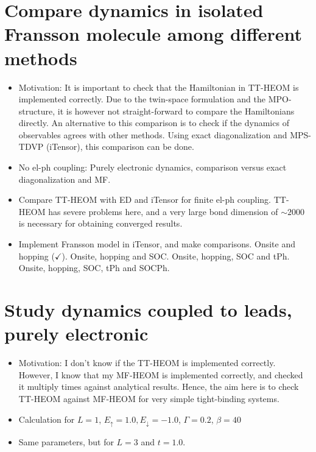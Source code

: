 \documentclass{article}
\begin{document}
\section{Compare dynamics in isolated Fransson molecule among different methods}
\begin{itemize}
	\item Motivation: It is important to check that the Hamiltonian in TT-HEOM is implemented correctly. Due to the twin-space formulation and the MPO-structure, it is however not straight-forward to compare the Hamiltonians directly. An alternative to this comparison is to check if the dynamics of observables agrees with other methods. Using exact diagonalization and MPS-TDVP (iTensor), this comparison can be done.
	\item[$\checkmark$] No el-ph coupling: Purely electronic dynamics, comparison versus exact diagonalization and MF. 
	\item[(partially done)] Compare TT-HEOM with ED and iTensor for finite el-ph coupling. {\color{red} TT-HEOM has severe problems here, and a very large bond dimension of $\sim 2000$ is necessary for obtaining converged results.}
	\item[(partially done)] Implement Fransson model in iTensor, and make comparisons. Onsite and hopping ($\checkmark$). Onsite, hopping and SOC. Onsite, hopping, SOC and tPh. Onsite, hopping, SOC, tPh and SOCPh.
\end{itemize}
\section{Study dynamics coupled to leads, purely electronic}
\begin{itemize}
	\item Motivation: I don't know if the TT-HEOM is implemented correctly. However, I know that my MF-HEOM is implemented correctly, and checked it multiply times against analytical results. Hence, the aim here is to check TT-HEOM against MF-HEOM for very simple tight-binding systems.
	\item Calculation for $L=1$, $E_\uparrow = 1.0, E_\downarrow = -1.0$, $\Gamma = 0.2$, $\beta = 40$
	\item Same parameters, but for $L=3$ and $t=1.0$.
\end{itemize}
\end{document}
